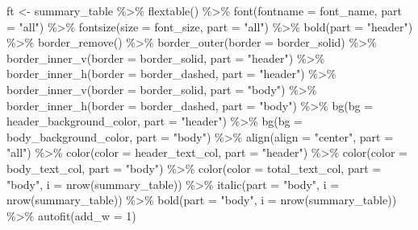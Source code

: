 \documentclass[
]{book}
\newenvironment{Shaded}{\begin{snugshade}}{\end{snugshade}}
\newcommand{\AttributeTok}[1]{\textcolor[rgb]{0.77,0.63,0.00}{#1}}
\newcommand{\DecValTok}[1]{\textcolor[rgb]{0.00,0.00,0.81}{#1}}
\newcommand{\FunctionTok}[1]{\textcolor[rgb]{0.00,0.00,0.00}{#1}}
\newcommand{\NormalTok}[1]{#1}
\newcommand{\OtherTok}[1]{\textcolor[rgb]{0.56,0.35,0.01}{#1}}
\newcommand{\SpecialCharTok}[1]{\textcolor[rgb]{0.00,0.00,0.00}{#1}}
\newcommand{\StringTok}[1]{\textcolor[rgb]{0.31,0.60,0.02}{#1}}
\begin{document}
\begin{Shaded}
\begin{Highlighting}[]
\NormalTok{ft }\OtherTok{\textless{}{-}}\NormalTok{ summary\_table }\SpecialCharTok{\%\textgreater{}\%}
  \FunctionTok{flextable}\NormalTok{() }\SpecialCharTok{\%\textgreater{}\%}
  \FunctionTok{font}\NormalTok{(}\AttributeTok{fontname =}\NormalTok{ font\_name, }\AttributeTok{part =} \StringTok{"all"}\NormalTok{) }\SpecialCharTok{\%\textgreater{}\%}
  \FunctionTok{fontsize}\NormalTok{(}\AttributeTok{size =}\NormalTok{ font\_size, }\AttributeTok{part =} \StringTok{"all"}\NormalTok{) }\SpecialCharTok{\%\textgreater{}\%}
  \FunctionTok{bold}\NormalTok{(}\AttributeTok{part =} \StringTok{"header"}\NormalTok{) }\SpecialCharTok{\%\textgreater{}\%}
  \FunctionTok{border\_remove}\NormalTok{() }\SpecialCharTok{\%\textgreater{}\%}
  \FunctionTok{border\_outer}\NormalTok{(}\AttributeTok{border =}\NormalTok{ border\_solid) }\SpecialCharTok{\%\textgreater{}\%}
  \FunctionTok{border\_inner\_v}\NormalTok{(}\AttributeTok{border =}\NormalTok{ border\_solid, }\AttributeTok{part =} \StringTok{"header"}\NormalTok{) }\SpecialCharTok{\%\textgreater{}\%}
  \FunctionTok{border\_inner\_h}\NormalTok{(}\AttributeTok{border =}\NormalTok{ border\_dashed, }\AttributeTok{part =} \StringTok{"header"}\NormalTok{) }\SpecialCharTok{\%\textgreater{}\%}
  \FunctionTok{border\_inner\_v}\NormalTok{(}\AttributeTok{border =}\NormalTok{ border\_solid, }\AttributeTok{part =} \StringTok{"body"}\NormalTok{) }\SpecialCharTok{\%\textgreater{}\%}
  \FunctionTok{border\_inner\_h}\NormalTok{(}\AttributeTok{border =}\NormalTok{ border\_dashed, }\AttributeTok{part =} \StringTok{"body"}\NormalTok{) }\SpecialCharTok{\%\textgreater{}\%}
  \FunctionTok{bg}\NormalTok{(}\AttributeTok{bg =}\NormalTok{ header\_background\_color, }\AttributeTok{part =} \StringTok{"header"}\NormalTok{) }\SpecialCharTok{\%\textgreater{}\%}
  \FunctionTok{bg}\NormalTok{(}\AttributeTok{bg =}\NormalTok{ body\_background\_color, }\AttributeTok{part =} \StringTok{"body"}\NormalTok{) }\SpecialCharTok{\%\textgreater{}\%}
  \FunctionTok{align}\NormalTok{(}\AttributeTok{align =} \StringTok{"center"}\NormalTok{, }\AttributeTok{part =} \StringTok{"all"}\NormalTok{) }\SpecialCharTok{\%\textgreater{}\%}
  \FunctionTok{color}\NormalTok{(}\AttributeTok{color =}\NormalTok{ header\_text\_col, }\AttributeTok{part =} \StringTok{"header"}\NormalTok{) }\SpecialCharTok{\%\textgreater{}\%}
  \FunctionTok{color}\NormalTok{(}\AttributeTok{color =}\NormalTok{ body\_text\_col, }\AttributeTok{part =} \StringTok{"body"}\NormalTok{) }\SpecialCharTok{\%\textgreater{}\%}
  \FunctionTok{color}\NormalTok{(}\AttributeTok{color =}\NormalTok{ total\_text\_col, }\AttributeTok{part =} \StringTok{"body"}\NormalTok{, }\AttributeTok{i =} \FunctionTok{nrow}\NormalTok{(summary\_table)) }\SpecialCharTok{\%\textgreater{}\%}
  \FunctionTok{italic}\NormalTok{(}\AttributeTok{part =} \StringTok{"body"}\NormalTok{, }\AttributeTok{i =} \FunctionTok{nrow}\NormalTok{(summary\_table)) }\SpecialCharTok{\%\textgreater{}\%}
  \FunctionTok{bold}\NormalTok{(}\AttributeTok{part =} \StringTok{"body"}\NormalTok{, }\AttributeTok{i =} \FunctionTok{nrow}\NormalTok{(summary\_table)) }\SpecialCharTok{\%\textgreater{}\%}
  \FunctionTok{autofit}\NormalTok{(}\AttributeTok{add\_w =} \DecValTok{1}\NormalTok{)}


\end{Highlighting}
\end{Shaded}
\end{document}
